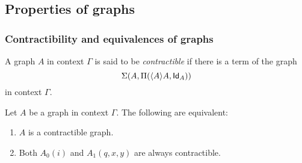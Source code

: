 \subsection{Properties of graphs}

\subsubsection{Contractibility and equivalences of graphs}

\begin{defn}
A graph $A$ in context $\Gamma$ is said to be \emph{contractible} if there
is a term of the graph
\begin{equation*}
\Sigma(A,\Pi({\langle A\rangle A},\mathsf{Id}_{A}))
\end{equation*}
in context $\Gamma$.
\end{defn}

\begin{lem}\label{lem:contractible-graphs}
Let $A$ be a graph in context $\Gamma$. The following are equivalent:
\begin{enumerate}
\item $A$ is a contractible graph.
\item Both $A_0(i)$ and $A_1(q,x,y)$ are always contractible.
\end{enumerate}
\end{lem}


